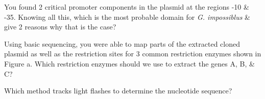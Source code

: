 \documentclass[addpoints]{exam}
\begin{document}
\begin{questions}

\question[3] You found 2 critical promoter components in the plasmid at the regions -10 \& -35. Knowing all this, which is the most probable domain for \textit{G. impossiblus} \& give 2 reasons why that is the case?


\question[3] Using basic sequencing, you were able to map parts of the extracted cloned plasmid as well as the restriction sites for 3 common restriction enzymes shown in Figure a. Which restriction enzymes should we use to extract the genes A, B, \& C? 


\question[1] Which method tracks light flashes to determine the nucleotide sequence? 



\end{questions}
\end{document}
